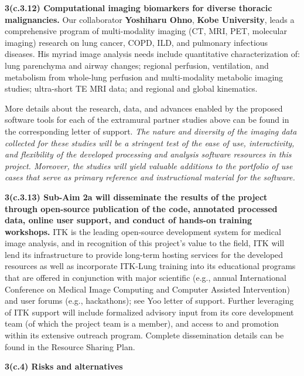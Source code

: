 \documentclass[11pt,]{article}
\begin{document}
\textbf{3(c.3.12) Computational imaging biomarkers for diverse thoracic
malignancies.} Our collaborator \textbf{Yoshiharu Ohno}, \textbf{Kobe
University}, leads a comprehensive program of multi-modality imaging
(CT, MRI, PET, molecular imaging) research on lung cancer, COPD, ILD,
and pulmonary infectious diseases. His myriad image analysis needs
include quantitative characterization of: lung parenchyma and airway
changes; regional perfusion, ventilation, and metabolism from whole-lung
perfusion and multi-modality metabolic imaging studies; ultra-short TE
MRI data; and regional and global kinematics.

More details about the research, data, and advances enabled by the
proposed software tools for each of the extramural partner studies above
can be found in the corresponding letter of support. \emph{The nature
and diversity of the imaging data collected for these studies will be a
stringent test of the ease of use, interactivity, and flexibility of the
developed processing and analysis software resources in this project.
Moreover, the studies will yield valuable additions to the portfolio of
use cases that serve as primary reference and instructional material for
the software.}

\textbf{3(c.3.13) Sub-Aim 2a will disseminate the results of the project
through open-source publication of the code, annotated processed data,
online user support, and conduct of hands-on training workshops.} ITK is
the leading open-source development system for medical image analysis,
and in recognition of this project's value to the field, ITK will lend
its infrastructure to provide long-term hosting services for the
developed resources as well as incorporate ITK-Lung training into its
educational programs that are offered in conjunction with major
scientific (e.g., annual International Conference on Medical Image
Computing and Computer Assisted Intervention) and user forums (e.g.,
hackathons); see Yoo letter of support. Further leveraging of ITK
support will include formalized advisory input from its core development
team (of which the project team is a member), and access to and
promotion within its extensive outreach program. Complete dissemination
details can be found in the Resource Sharing Plan.

\textbf{3(c.4) Risks and alternatives}
\end{document}
